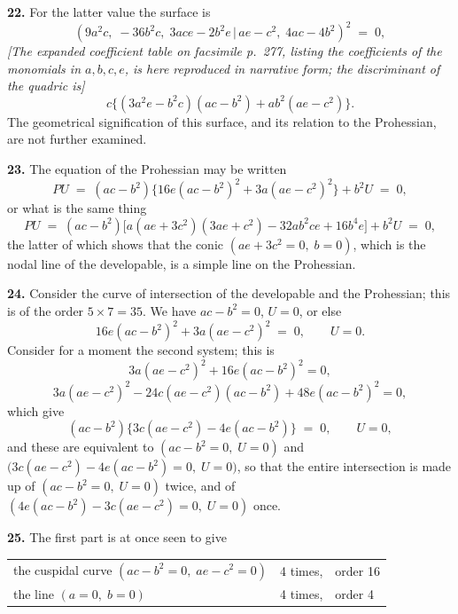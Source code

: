 \documentclass[11pt,a4paper]{article}
\providecommand{\mid}{\,|\,}
\begin{document}
\medskip

\textbf{22.} For the latter value the surface is
\[
(9a^2c,\;-36b^2c,\;3ace - 2b^2e\mid ae - c^2,\;4ac-4b^2)^2 \;=\; 0,
\]
\textit{[The expanded coefficient table on facsimile p.~277, listing the coefficients of the monomials in $a,b,c,e$, is here reproduced in narrative form; the discriminant of the quadric is]}
\[
c\bigl\{(3a^2e - b^2c)(ac - b^2) + ab^2(ae - c^2)\bigr\}.
\]
The geometrical signification of this surface, and its relation to the Prohessian, are not further examined.

\medskip

\textbf{23.} The equation of the Prohessian may be written
\[
PU \;=\; (ac - b^2)\bigl\{16e(ac - b^2)^2 + 3a(ae - c^2)^2\bigr\} + b^2 U \;=\; 0,
\]
or what is the same thing
\[
PU \;=\; (ac - b^2)\bigl[a(ae + 3c^2)(3ae + c^2) - 32ab^2 ce + 16b^4 e\bigr] + b^2 U \;=\; 0,
\]
the latter of which shows that the conic $(ae + 3c^2 = 0,\;b = 0)$, which is the nodal line of the developable, is a simple line on the Prohessian.

\medskip

\textbf{24.} Consider the curve of intersection of the developable and the Prohessian; this is of the order $5\times 7 = 35$. We have $ac - b^2 = 0$, $U = 0$, or else
\[
16e(ac - b^2)^2 + 3a(ae - c^2)^2 \;=\; 0,\qquad U = 0.
\]
Consider for a moment the second system; this is
\[
3a(ae - c^2)^2 + 16e(ac - b^2)^2 = 0,
\]
\[
3a(ae - c^2)^2 - 24c(ae - c^2)(ac - b^2) + 48e(ac - b^2)^2 = 0,
\]
which give
\[
(ac - b^2)\bigl\{3c(ae - c^2) - 4e(ac - b^2)\bigr\} \;=\; 0,\qquad U = 0,
\]
and these are equivalent to $(ac - b^2 = 0,\;U=0)$ and $\bigl(3c(ae - c^2) - 4e(ac - b^2) = 0,\;U = 0\bigr)$, so that the entire intersection is made up of $(ac - b^2 = 0,\;U=0)$ twice, and of $(4e(ac - b^2) - 3c(ae - c^2) = 0,\;U = 0)$ once.

\medskip

\textbf{25.} The first part is at once seen to give
\begin{center}
\begin{tabular}{lll}
the cuspidal curve $(ac - b^2 = 0,\;ae - c^2 = 0)$ & 4 times, & order 16\\
the line $(a = 0,\;b = 0)$ & 4 times, & order 4
\end{tabular}
\end{center}
\end{document}
